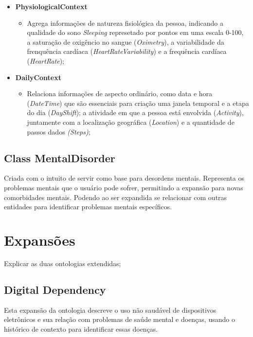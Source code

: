 \documentclass[12pt]{article}
\begin{document}
\begin{itemize}
    \item \textbf{PhysiologicalContext}
    \begin{itemize}
    \item Agrega informações de natureza fisiológica da pessoa, indicando a qualidade do sono \textit{Sleeping} represetado por pontos em uma escala 0-100, a saturação de oxigêncio no sangue (\textit{Oximetry}), a variabilidade da frenquência cardíaca (\textit{HeartRateVariability}) e a frequência cardíaca (\textit{HeartRate});
    \end{itemize}
    
    \item \textbf{DailyContext}
    \begin{itemize}
    \item Relaciona informações de aspecto ordinário, como data e hora (\textit{DateTime}) que são essenciais para criação uma janela temporal e a etapa do dia (\textit{DayShift}); a atividade em que a pessoa está envolvida (\textit{Activity}), juntamente com a localização geográfica (\textit{Location}) e a quantidade de passos dados \textit{(Steps)};
    \end{itemize}
\end{itemize}

\subsection{Class MentalDisorder}
Criada com o intuito de servir como base para desordens mentais. Representa os problemas mentais que o usuário pode sofrer, permitindo a expansão para novas comorbidades mentais. Podendo ao ser expandida se relacionar com outras entidades para identificar problemas mentais específicos.

\section{Expansões}\label{sec:figs}

Explicar as duas ontologias extendidas;

\subsection{Digital Dependency}
Esta expansão da ontologia descreve o uso não saudável de dispositivos eletrônicos e sua relação com problemas de saúde mental e doenças, usando o histórico de contexto para identificar essas doenças.
\end{document}
